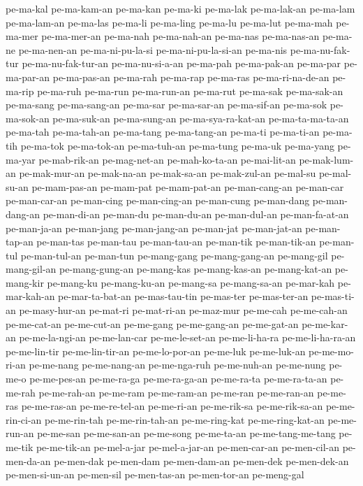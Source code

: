{pe-ma-kal pe-ma-kam-an pe-ma-kan pe-ma-ki pe-ma-lak pe-ma-lak-an pe-ma-lam
pe-ma-lam-an pe-ma-las pe-ma-li pe-ma-ling pe-ma-lu pe-ma-lut pe-ma-mah
pe-ma-mer pe-ma-mer-an pe-ma-nah pe-ma-nah-an pe-ma-nas pe-ma-nas-an
pe-ma-ne pe-ma-nen-an pe-ma-ni-pu-la-si pe-ma-ni-pu-la-si-an pe-ma-nis
pe-ma-nu-fak-tur pe-ma-nu-fak-tur-an pe-ma-nu-si-a-an pe-ma-pah
pe-ma-pak-an pe-ma-par pe-ma-par-an pe-ma-pas-an pe-ma-rah pe-ma-rap
pe-ma-ras pe-ma-ri-na-de-an pe-ma-rip pe-ma-ruh pe-ma-run pe-ma-run-an
pe-ma-rut pe-ma-sak pe-ma-sak-an pe-ma-sang pe-ma-sang-an pe-ma-sar
pe-ma-sar-an pe-ma-sif-an pe-ma-sok pe-ma-sok-an pe-ma-suk-an
pe-ma-sung-an pe-ma-sya-ra-kat-an pe-ma-ta-ma-ta-an pe-ma-tah pe-ma-tah-an
pe-ma-tang pe-ma-tang-an pe-ma-ti pe-ma-ti-an pe-ma-tih pe-ma-tok
pe-ma-tok-an pe-ma-tuh-an pe-ma-tung pe-ma-uk pe-ma-yang pe-ma-yar
pe-mab-rik-an pe-mag-net-an pe-mah-ko-ta-an pe-mai-lit-an pe-mak-lum-an
pe-mak-mur-an pe-mak-na-an pe-mak-sa-an pe-mak-zul-an pe-mal-su
pe-mal-su-an pe-mam-pas-an pe-mam-pat pe-mam-pat-an pe-man-cang-an
pe-man-car pe-man-car-an pe-man-cing pe-man-cing-an pe-man-cung
pe-man-dang pe-man-dang-an pe-man-di-an pe-man-du pe-man-du-an
pe-man-dul-an pe-man-fa-at-an pe-man-ja-an pe-man-jang pe-man-jang-an
pe-man-jat pe-man-jat-an pe-man-tap-an pe-man-tas pe-man-tau pe-man-tau-an
pe-man-tik pe-man-tik-an pe-man-tul pe-man-tul-an pe-man-tun pe-mang-gang
pe-mang-gang-an pe-mang-gil pe-mang-gil-an pe-mang-gung-an pe-mang-kas
pe-mang-kas-an pe-mang-kat-an pe-mang-kir pe-mang-ku pe-mang-ku-an
pe-mang-sa pe-mang-sa-an pe-mar-kah pe-mar-kah-an pe-mar-ta-bat-an
pe-mas-tau-tin pe-mas-ter pe-mas-ter-an pe-mas-ti-an pe-masy-hur-an
pe-mat-ri pe-mat-ri-an pe-maz-mur pe-me-cah pe-me-cah-an pe-me-cat-an
pe-me-cut-an pe-me-gang pe-me-gang-an pe-me-gat-an pe-me-kar-an
pe-me-la-ngi-an pe-me-lan-car pe-me-le-set-an pe-me-li-ha-ra
pe-me-li-ha-ra-an pe-me-lin-tir pe-me-lin-tir-an pe-me-lo-por-an pe-me-luk
pe-me-luk-an pe-me-mo-ri-an pe-me-nang pe-me-nang-an pe-me-nga-ruh
pe-me-nuh-an pe-me-nung pe-me-o pe-me-pes-an pe-me-ra-ga pe-me-ra-ga-an
pe-me-ra-ta pe-me-ra-ta-an pe-me-rah pe-me-rah-an pe-me-ram pe-me-ram-an
pe-me-ran pe-me-ran-an pe-me-ras pe-me-ras-an pe-me-re-tel-an pe-me-ri-an
pe-me-rik-sa pe-me-rik-sa-an pe-me-rin-ci-an pe-me-rin-tah
pe-me-rin-tah-an pe-me-ring-kat pe-me-ring-kat-an pe-me-run-an pe-me-san
pe-me-san-an pe-me-song pe-me-ta-an pe-me-tang-me-tang pe-me-tik
pe-me-tik-an pe-mel-a-jar pe-mel-a-jar-an pe-men-car-an pe-men-cil-an
pe-men-da-an pe-men-dak pe-men-dam pe-men-dam-an pe-men-dek pe-men-dek-an
pe-men-si-un-an pe-men-sil pe-men-tas-an pe-men-tor-an pe-meng-gal
}

